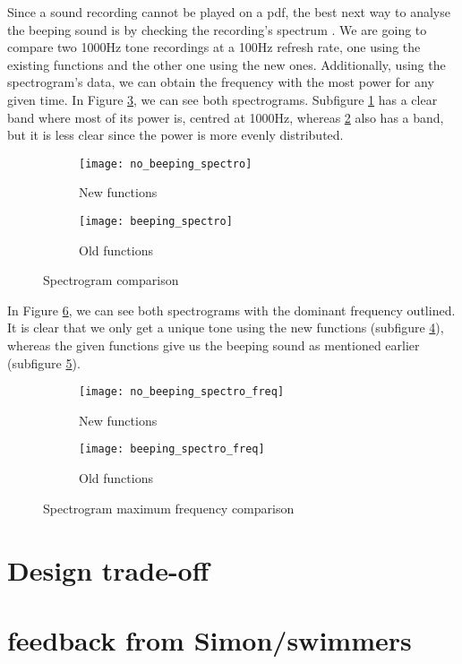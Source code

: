 Since a sound recording cannot be played on a pdf, the best next way to analyse the beeping sound is by checking the recording's spectrum . We are going to compare two 1000Hz tone recordings at a 100Hz refresh rate, one using the existing functions and the other one using the new ones. Additionally, using the spectrogram's data, we can obtain the frequency with the most power for any given time.
In Figure \ref{fig:spectro}, we can see both spectrograms. Subfigure \ref{fig:spectro_no_beep} has a clear band where most of its power is, centred at 1000Hz, whereas \ref{fig:spectro_beep} also has a band, but it is less clear since the power is more evenly distributed.
\begin{figure}[hbt!]
	\centering
	\begin{subfigure}{0.48\linewidth}
		\centering
		\texttt{[image: no\_beeping\_spectro]}
		\caption{New functions}
		\label{fig:spectro_no_beep}
	\end{subfigure}
	\begin{subfigure}{0.48\linewidth}
		\centering
		\texttt{[image: beeping\_spectro]}
		\caption{Old functions}
		\label{fig:spectro_beep}
	\end{subfigure}
	\caption{Spectrogram comparison}
	\label{fig:spectro}
\end{figure}

In Figure \ref{fig:spectro_freq}, we can see both spectrograms with the dominant frequency outlined. It is clear that we only get a unique tone using the new functions (subfigure \ref{fig:spectro_freq_no_beep}), whereas the given functions give us the beeping sound as mentioned earlier (subfigure \ref{fig:spectro_freq_beep}).

\begin{figure}[hbt!]
	\centering
	\begin{subfigure}{0.48\linewidth}
		\centering
		\texttt{[image: no\_beeping\_spectro\_freq]}
		\caption{New functions}
		\label{fig:spectro_freq_no_beep}
	\end{subfigure}
	\begin{subfigure}{0.48\linewidth}
		\centering
		\texttt{[image: beeping\_spectro\_freq]}
		\caption{Old functions}
		\label{fig:spectro_freq_beep}
	\end{subfigure}
	\caption{Spectrogram maximum frequency comparison}
	\label{fig:spectro_freq}
\end{figure}


\section{Design trade-off}

\section{feedback from Simon/swimmers}

